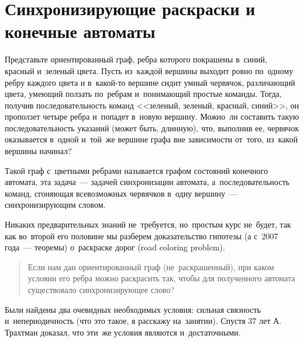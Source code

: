 
\section*{Синхронизирующие раскраски и конечные автоматы}



Представьте ориентированный граф, ребра которого покрашены в~синий, красный
и~зеленый цвета.
Пусть из~каждой вершины выходит ровно по~одному ребру каждого цвета
и в~какой-то вершине сидит умный червячок, различающий цвета, умеющий ползать
по~ребрам и~понимающий простые команды.
Тогда, получив последовательность команд <<зеленый, зеленый, красный, синий>>, он
проползет четыре ребра и~попадет в~новую вершину.
Можно~ли составить такую последовательность указаний (может быть, длинную),
что, выполнив ее, червячок оказывается в~одной и~той~же вершине графа
вне зависимости от~того, из~какой вершины начинал?

Такой граф с~цветными ребрами называется графом состояний конечного автомата,
эта задача~--- задачей синхронизации автомата, а~последовательность команд,
сгоняющая всевозможных червячков в~одну вершину~--- синхронизирующим словом.

Никаких предварительных знаний не~требуется, но~простым курс не~будет, так как
во~второй его половине мы разберем доказательство гипотезы
(а с~2007 года~--- теоремы) о~раскраске дорог (road coloring problem).

\begin{quote}
Если нам дан ориентированный граф (не~раскрашенный), при каком условии его
ребра можно раскрасить так, чтобы для полученного автомата существовало
синхронизирующее слово?
\end{quote}

Были найдены два очевидных необходимых условия: сильная связность
и~непериодичность (что это такое, я расскажу на~занятии).
Спустя 37 лет А.\,Трахтман доказал, что эти~же условия являются и~достаточными.

